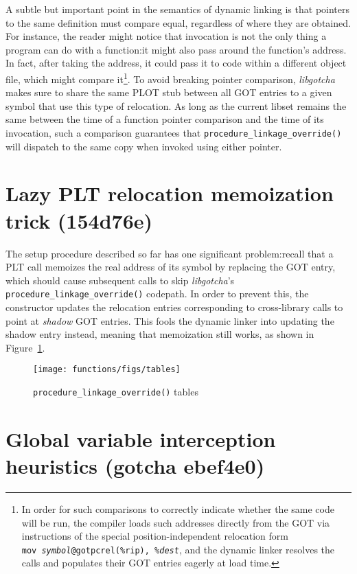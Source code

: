\documentclass[12pt,letterpaper]{book}
\makeatletter
\let\includegraphics@\includegraphics
\renewcommand{\includegraphics}[2][]{\includegraphics@[#1]{\includegraphicsdir#2}}
\newcommand{\includegraphicsdir}{}
\makeatother
\begin{document}
A subtle but important point in the semantics of dynamic linking is that pointers to
the same definition must compare equal, regardless of where they are obtained.  For
instance,
the reader might notice that invocation is not the only thing a program can do with a
function:\@ it might also pass around the function's address.  In fact, after taking
the address, it could pass it to code within a different object file, which might
compare it\footnote{In order for such comparisons to correctly indicate whether the
same code will be run, the compiler loads such addresses directly from the GOT via
instructions of the special position-independent relocation form
\texttt{mov~\textit{symbol}@gotpcrel(\%rip),~\%\textit{dest}}, and the dynamic linker
resolves the calls and populates their GOT entries eagerly at load time.}.  To avoid
breaking pointer comparison, \textit{libgotcha} makes sure to share the same PLOT
stub between all GOT entries to a given symbol that use this type of
relocation.  As long as the current libset remains the same between the time of a
function pointer comparison and the time of its invocation, such a comparison
guarantees that \texttt{procedure\_linkage\_override()} will dispatch to the same
copy when invoked using either pointer.


\section{Lazy PLT relocation memoization trick (154d76e)}

The setup procedure described so far has one significant problem:\@ recall that a PLT
call memoizes the real address of its symbol by replacing the GOT entry, which should
cause subsequent calls to skip \textit{libgotcha}'s \texttt{procedure\_linkage\_override()}
codepath.  In order to prevent this, the constructor updates the relocation entries
corresponding to cross-library calls to point at \textit{shadow} GOT entries.  This
fools the dynamic linker into updating the shadow entry instead, meaning that
memoization still works, as shown in Figure~\ref{fig:override}.

\begin{figure}
\texttt{[image: functions/figs/tables]}
\caption{\texttt{procedure\_linkage\_override()} tables}
\label{fig:override}
\end{figure}


\section{Global variable interception heuristics (gotcha ebef4e0)}
\end{document}

